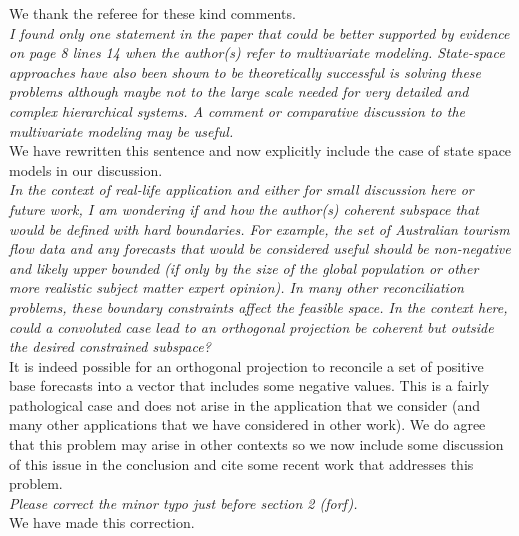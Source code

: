 \documentclass[a4paper,11pt]{article}
\begin{document}
	\noindent We thank the referee for these kind comments.\\
	
    \noindent\textit{I found only one statement in the paper that could be better supported by evidence on page 8 lines 14 when the author(s) refer to multivariate modeling. State-space approaches have also been shown to be theoretically successful is solving these problems although maybe not to the large scale needed for very detailed and complex hierarchical systems. A comment or comparative discussion to the multivariate modeling may be useful.}\\

    \noindent We have rewritten this sentence and now explicitly include the case of state space models in our discussion.\\


    \noindent\textit{In the context of real-life application and either for small discussion here or future work, I am wondering if and how the author(s) coherent subspace that would be defined with hard boundaries. For example, the set of Australian tourism flow data and any forecasts that would be considered useful should be non-negative and likely upper bounded (if only by the size of the global population or other more realistic subject matter expert opinion). In many other reconciliation problems, these boundary constraints affect the feasible space. In the context here, could a convoluted case lead to an orthogonal projection be coherent but outside the desired constrained subspace?}\\

    \noindent It is indeed possible for an orthogonal projection to reconcile a set of positive base forecasts into a vector that includes some negative values.  This is a fairly pathological case and does not arise in the application that we consider (and many other applications that we have considered in other work).  We do agree that this problem may arise in other contexts so we now include some discussion of this issue in the conclusion and cite some recent work that addresses this problem.\\

    \noindent\textit{Please correct the minor typo just before section 2 (forf).}\\

    \noindent We have made this correction.\\
\end{document}
